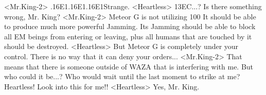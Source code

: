 <Mr.King-2> .{16}{E1}.{16}{E1}.{16}{E1}Strange. 
<Heartless> {13}{EC}...? 
Is there something wrong, Mr. King? 
<Mr.King-2> Meteor G is not utilizing 100%
It should be able to produce much more powerful Jamming. 
Its Jamming should be able to block all EM beings from entering or leaving, plus all 
humans that are touched by it should be destroyed. 
<Heartless> But Meteor G is completely under your control. 
There is no way that it can deny your orders... 
<Mr.King-2> That means that there is someone outside of WAZA that is interfering with me. 
But who could it be...? 
Who would wait until the last moment to strike at me? 
Heartless! 
Look into this for me!! 
<Heartless> Yes, Mr. King. 
